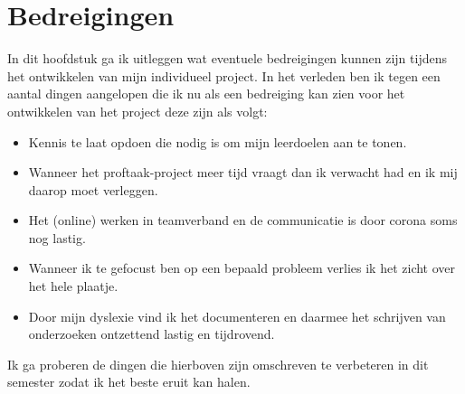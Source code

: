\documentclass[11pt, twoside]{report}
\begin{document}
    \section{Bedreigingen}\label{sec:bedreigingen}
    In dit hoofdstuk ga ik uitleggen wat eventuele bedreigingen kunnen zijn tijdens het ontwikkelen van mijn individueel project.
    In het verleden ben ik tegen een aantal dingen aangelopen die ik nu als een bedreiging kan zien voor het ontwikkelen van het project deze zijn als volgt:
    \begin{itemize}
        \item[] Kennis te laat opdoen die nodig is om mijn leerdoelen aan te tonen.
        \item[] Wanneer het proftaak-project meer tijd vraagt dan ik verwacht had en ik mij daarop moet verleggen.
        \item[] Het (online) werken in teamverband en de communicatie is door corona soms nog lastig.
        \item[] Wanneer ik te gefocust ben op een bepaald probleem verlies ik het zicht over het hele plaatje.
        \item[] Door mijn dyslexie vind ik het documenteren en daarmee het schrijven van onderzoeken ontzettend lastig en tijdrovend.
    \end{itemize}
    Ik ga proberen de dingen die hierboven zijn omschreven te verbeteren in dit semester zodat ik het beste eruit kan halen.
\end{document}

